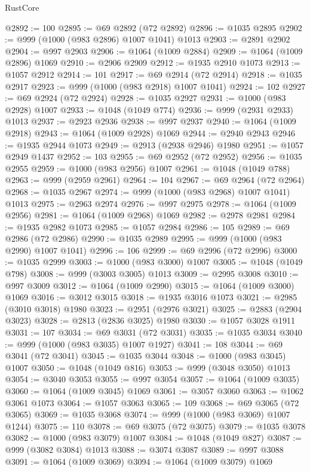 \begin{lexlean}{RustCore}
\begin{coremodule}
@2892 := 100
@2895 := @69 @2892 (@72 @2892)
@2896 := @1035 @2895
@2902 := @999 (@1000 (@983 @2896) @1007 @1041) @1013
@2903 := @2891 @2902
@2904 := @997 @2903
@2906 := @1064 (@1009 @2884)
@2909 := @1064 (@1009 @2896) @1069
@2910 := @2906 @2909
@2912 := @1935 @2910 @1073
@2913 := @1057 @2912
@2914 := 101
@2917 := @69 @2914 (@72 @2914)
@2918 := @1035 @2917
@2923 := @999 (@1000 (@983 @2918) @1007 @1041)
@2924 := 102
@2927 := @69 @2924 (@72 @2924)
@2928 := @1035 @2927
@2931 := @1000 (@983 @2928) @1007
@2933 := @1048 (@1049 @774)
@2936 := @999 (@2931 @2933) @1013
@2937 := @2923 @2936
@2938 := @997 @2937
@2940 := @1064 (@1009 @2918)
@2943 := @1064 (@1009 @2928) @1069
@2944 := @2940 @2943
@2946 := @1935 @2944 @1073
@2949 := @2913 (@2938 @2946) @1980
@2951 := @1057 @2949 @1437
@2952 := 103
@2955 := @69 @2952 (@72 @2952)
@2956 := @1035 @2955
@2959 := @1000 (@983 @2956) @1007
@2961 := @1048 (@1049 @788)
@2963 := @999 (@2959 @2961)
@2964 := 104
@2967 := @69 @2964 (@72 @2964)
@2968 := @1035 @2967
@2974 := @999 (@1000 (@983 @2968) @1007 @1041) @1013
@2975 := @2963 @2974
@2976 := @997 @2975
@2978 := @1064 (@1009 @2956)
@2981 := @1064 (@1009 @2968) @1069
@2982 := @2978 @2981
@2984 := @1935 @2982 @1073
@2985 := @1057 @2984
@2986 := 105
@2989 := @69 @2986 (@72 @2986)
@2990 := @1035 @2989
@2995 := @999 (@1000 (@983 @2990) @1007 @1041)
@2996 := 106
@2999 := @69 @2996 (@72 @2996)
@3000 := @1035 @2999
@3003 := @1000 (@983 @3000) @1007
@3005 := @1048 (@1049 @798)
@3008 := @999 (@3003 @3005) @1013
@3009 := @2995 @3008
@3010 := @997 @3009
@3012 := @1064 (@1009 @2990)
@3015 := @1064 (@1009 @3000) @1069
@3016 := @3012 @3015
@3018 := @1935 @3016 @1073
@3021 := @2985 (@3010 @3018) @1980
@3023 := @2951 (@2976 @3021)
@3025 := @2883 (@2904 @3023)
@3028 := @2813 (@2836 @3025) @1980
@3030 := @1057 @3028 @1911
@3031 := 107
@3034 := @69 @3031 (@72 @3031)
@3035 := @1035 @3034
@3040 := @999 (@1000 (@983 @3035) @1007 @1927)
@3041 := 108
@3044 := @69 @3041 (@72 @3041)
@3045 := @1035 @3044
@3048 := @1000 (@983 @3045) @1007
@3050 := @1048 (@1049 @816)
@3053 := @999 (@3048 @3050) @1013
@3054 := @3040 @3053
@3055 := @997 @3054
@3057 := @1064 (@1009 @3035)
@3060 := @1064 (@1009 @3045) @1069
@3061 := @3057 @3060
@3063 := @1062 @3061 @1073
@3064 := @1057 @3063
@3065 := 109
@3068 := @69 @3065 (@72 @3065)
@3069 := @1035 @3068
@3074 := @999 (@1000 (@983 @3069) @1007 @1244)
@3075 := 110
@3078 := @69 @3075 (@72 @3075)
@3079 := @1035 @3078
@3082 := @1000 (@983 @3079) @1007
@3084 := @1048 (@1049 @827)
@3087 := @999 (@3082 @3084) @1013
@3088 := @3074 @3087
@3089 := @997 @3088
@3091 := @1064 (@1009 @3069)
@3094 := @1064 (@1009 @3079) @1069

\end{coremodule}
\end{lexlean}
